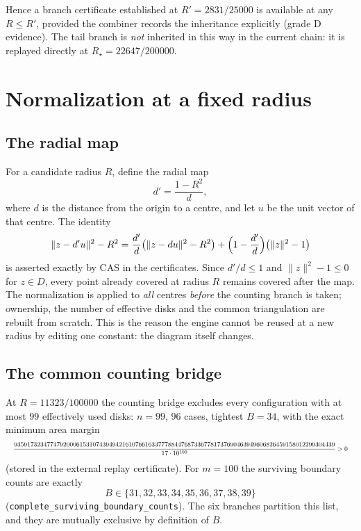 Hence a branch certificate established at $R'=2831/25000$ is available at any $R\le R'$, provided
the combiner records the inheritance explicitly (grade D evidence). The tail branch is \emph{not}
inherited in this way in the current chain: it is replayed directly at $R_\star=22647/200000$.

\section{Normalization at a fixed radius}

\subsection{The radial map}

For a candidate radius $R$, define the radial map
\[
d'=\frac{1-R^2}{d},
\]
where $d$ is the distance from the origin to a centre, and let $u$ be the unit vector of that centre.
The identity
\begin{equation}\label{eq:radial-identity}
\|z-d'u\|^2-R^2=\frac{d'}{d}\bigl(\|z-du\|^2-R^2\bigr)+\Bigl(1-\frac{d'}{d}\Bigr)\bigl(\|z\|^2-1\bigr)
\end{equation}
is asserted exactly by CAS in the certificates. Since $d'/d\le1$ and $\|z\|^2-1\le0$ for
$z\in D$, every point already covered at radius $R$ remains covered after the map. The normalization
is applied to \emph{all} centres \emph{before} the counting branch is taken; ownership, the number of
effective disks and the common triangulation are rebuilt from scratch. This is the reason the
engine cannot be reused at a new radius by editing one constant: the diagram itself changes.

\subsection{The common counting bridge}

At $R=11323/100000$ the counting bridge excludes every configuration with at most $99$ effectively
used disks: $n=99$, $96$ cases, tightest $B=34$, with the exact minimum area margin
\[
\resizebox{\textwidth}{!}{$\displaystyle \frac{93591732347747920006153107439494216107661633777884476873367781737690463949606826459158012299304439}{17\cdot10^{100}}>0$}
\]
(stored in the external replay certificate). For $m=100$ the surviving boundary counts are exactly
\[
B\in\{31,32,33,34,35,36,37,38,39\}
\]
(\texttt{complete\_\allowbreak{}surviving\_\allowbreak{}boundary\_\allowbreak{}counts}). The six branches partition this list, and they are
mutually exclusive by definition of $B$.

